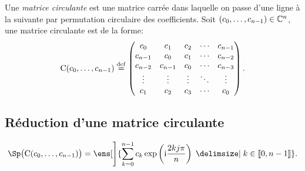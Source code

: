 \begin{defi}
Une \emph{matrice circulante} est une matrice carrée dans laquelle on passe d'une ligne à la suivante par permutation circulaire des coefficients. Soit $(c_0, \dots, c_{n-1}) \in \mathbb{C}^n$, une matrice circulante est de la forme:
\[
\mathrm{C}(c_0, \dots, c_{n-1}) \overset{\mathrm{\tiny def}}{=}
\begin{pmatrix}
c_0 & c_1 & c_2 & \cdots & c_{n-1} \\
c_{n-1} & c_0 & c_1 & \cdots & c_{n-2} \\
c_{n-2} & c_{n-1} & c_0 & \cdots & c_{n-3} \\
\vdots & \vdots & \vdots & \ddots & \vdots \\
c_1 & c_2 & c_3 & \cdots & c_0
\end{pmatrix}.
\]
\end{defi}

\subsection{Réduction d'une matrice circulante}

\begin{prop}
    \[
    \Sp \big( \mathrm{C}(c_0, \dots, c_{n-1}) \big) = \ens[\Bigg]{ \sum_{k=0}^{n-1} c_k \exp \left( \i \frac{2kj \pi}{n} \right) \tq k \in \llbracket 0, n-1 \rrbracket }.
    \]
\end{prop}

